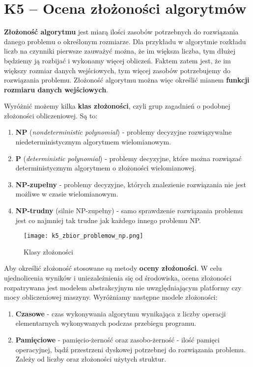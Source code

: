\section{K5 -- Ocena złożoności algorytmów}

\textbf{Złożoność algorytmu} jest miarą ilości zasobów potrzebnych do rozwiązania danego problemu o określonym rozmiarze. Dla przykładu w algorytmie rozkładu liczb na czynniki pierwsze zauważyć można, że im większa liczba, tym dłużej będziemy ją rozbijać i wykonamy więcej obliczeń. Faktem zatem jest, że im większy rozmiar danych wejściowych, tym więcej zasobów potrzebujemy do rozwiązania problemu. Złożoność algorytmu można więc określić mianem \textbf{funkcji rozmiaru danych wejściowych}.

Wyróżnić możemy kilka \textbf{klas złożoności}, czyli grup zagadnień o podobnej złożoności obliczeniowej. Są to:
\begin{enumerate}
	\item \textbf{NP} (\textit{nondeterministic polynomial}) - problemy decyzyjne rozwiązywalne niedeterministycznym algorytmem wielomianowym.
	\item \textbf{P} (\textit{deterministic polynomial}) - problemy decyzyjne, które można rozwiązać deterministycznym algorytmem o złożoności wielomianowej.
	\item \textbf{NP-zupełny} - problemy decyzyjne, których znalezienie rozwiązania nie jest możliwe w czasie wielomianowym.
	\item \textbf{NP-trudny} (silnie NP-zupełny) - samo sprawdzenie rozwiązania problemu jest co najmniej tak trudne jak każdego innego problemu NP.
\end{enumerate}

\begin{figure}[H]
	\centering
	\texttt{[image: k5\_zbior\_problemow\_np.png]}
	\caption{Klasy złożoności}
\end{figure}

Aby określić złożoność stosowane są metody \textbf{oceny złożoności}. W celu ujednolicenia wyników i uniezależnienia się od środowiska, ocena złożoności rozpatrywana jest modelem abstrakcyjnym nie uwzględniającym platformy czy mocy obliczeniowej maszyny. Wyróżniamy następne modele złożoności:
\begin{enumerate}
	\item \textbf{Czasowe} - czas wykonywania algorytmu wynikająca z liczby operacji elementarnych wykonywanych podczas przebiegu programu.
	\item \textbf{Pamięciowe} - pamięcio-żerność oraz zasobo-żerność - ilość pamięci operacyjnej, bądź przestrzeni dyskowej potrzebnej do rozwiązania problemu. Zależy od liczby oraz złożoności użytych struktur.
\end{enumerate}

